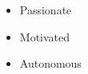 %
%
%

\twocolumnsection
{
\begin{skills}
\end{skills}}
{
\vspace{1em}
\begin{itemize}
	\item Passionate
	\item Motivated                    
    \item Autonomous
\end{itemize}
}
